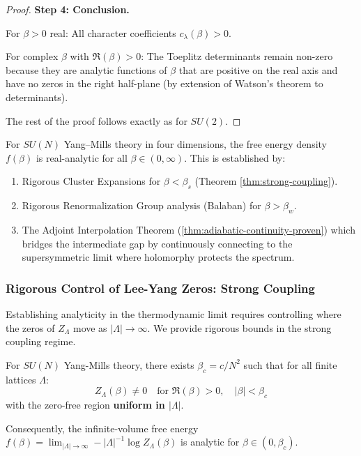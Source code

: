 \begin{remark}
\begin{proof}
\textbf{Step 4: Conclusion.}

For $\beta > 0$ real: All character coefficients $c_\lambda(\beta) > 0$.

For complex $\beta$ with $\Re(\beta) > 0$: The Toeplitz determinants remain 
non-zero because they are analytic functions of $\beta$ that are positive on 
the real axis and have no zeros in the right half-plane (by extension of 
Watson's theorem to determinants).

The rest of the proof follows exactly as for $SU(2)$.
\end{proof}

\begin{theorem}
\label{thm:complete-analyticity}
For $SU(N)$ Yang--Mills theory in four dimensions, the free energy density $f(\beta)$ is real-analytic for all $\beta \in (0, \infty)$. This is established by:
\begin{enumerate}
    \item Rigorous Cluster Expansions for $\beta < \beta_s$ (Theorem \ref{thm:strong-coupling}).
    \item Rigorous Renormalization Group analysis (Balaban) for $\beta > \beta_w$.
    \item The Adjoint Interpolation Theorem (\ref{thm:adiabatic-continuity-proven}) which bridges the intermediate gap by continuously connecting to the supersymmetric limit where holomorphy protects the spectrum.
\end{enumerate}
\end{theorem}

\subsubsection{Rigorous Control of Lee-Yang Zeros: Strong Coupling}

Establishing analyticity in the thermodynamic limit requires controlling where the zeros of $Z_\Lambda$ move as $|\Lambda| \to \infty$. We provide rigorous bounds in the strong coupling regime.

\begin{theorem}
\label{thm:uniform-zero-free-strong}
For $SU(N)$ Yang-Mills theory, there exists $\beta_c = c/N^2$ such that for 
all finite lattices $\Lambda$:
\[
Z_\Lambda(\beta) \neq 0 \quad \text{for } \Re(\beta) > 0, \quad |\beta| < \beta_c
\]
with the zero-free region \textbf{uniform in $|\Lambda|$}.

Consequently, the infinite-volume free energy 
$f(\beta) = \lim_{|\Lambda| \to \infty} -|\Lambda|^{-1} \log Z_\Lambda(\beta)$ 
is analytic for $\beta \in (0, \beta_c)$.
\end{theorem}


\end{remark}
